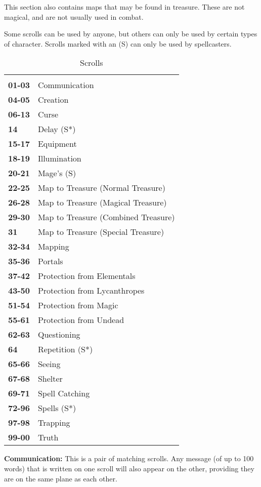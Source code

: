 \begin{multicols*}{2}
This section also contains maps that may be found in treasure. These are not magical, and are not usually used in combat.

Some scrolls can be used by anyone, but others can only be used by certain types of character. Scrolls marked with an (S) can only be used by spellcasters.

\begin {table}[H]
  \caption{Scrolls}
  \begin{tabularx}{\columnwidth}{>{\bfseries}YY}
	 & \\
	01-03 & Communication\\
	04-05 & Creation\\
	06-13 & Curse\\
	14 & Delay (S*)\\
	15-17 & Equipment\\
	18-19 & Illumination\\
	20-21 & Mage’s (S)\\
	22-25 & Map to Treasure (Normal Treasure)\\
	26-28 & Map to Treasure (Magical Treasure)\\
	29-30 & Map to Treasure (Combined Treasure)\\
	31 & Map to Treasure (Special Treasure)\\
	32-34 & Mapping\\
	35-36 & Portals\\
	37-42 & Protection from Elementals\\
	43-50 & Protection from Lycanthropes\\
	51-54 & Protection from Magic\\
	55-61 & Protection from Undead\\
	62-63 & Questioning\\
	64 & Repetition (S*)\\
	65-66 & Seeing\\
	67-68 & Shelter\\
	69-71 & Spell Catching\\
	72-96 & Spells (S*)\\
	97-98 & Trapping\\
	99-00 & Truth
  \end {tabularx}
\end {table}

\textbf{Communication:} This is a pair of matching scrolls. Any message (of up to 100 words) that is written on one scroll will also appear on the other, providing they are on the same plane as each other.


\end{multicols*}
